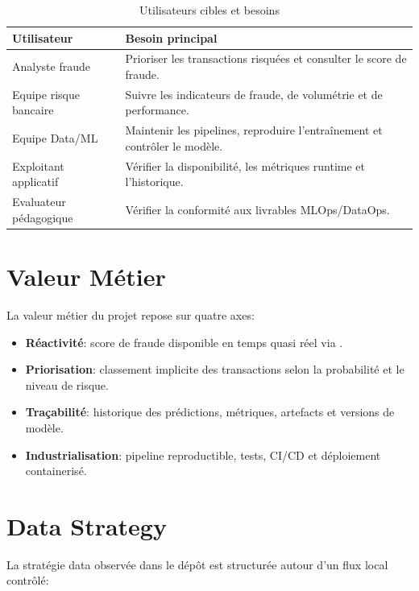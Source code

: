 \begin{table}[htbp]
\centering
\caption{Utilisateurs cibles et besoins}
\begin{tabularx}{\textwidth}{p{}X}
\toprule
Utilisateur & Besoin principal\\
\midrule
Analyste fraude & Prioriser les transactions risquées et consulter le score de fraude.\\
Equipe risque bancaire & Suivre les indicateurs de fraude, de volumétrie et de performance.\\
Equipe Data/ML & Maintenir les pipelines, reproduire l'entraînement et contrôler le modèle.\\
Exploitant applicatif & Vérifier la disponibilité, les métriques runtime et l'historique.\\
Evaluateur pédagogique & Vérifier la conformité aux livrables MLOps/DataOps.\\
\bottomrule
\end{tabularx}
\end{table}

\section{Valeur Métier}

La valeur métier du projet repose sur quatre axes:

\begin{itemize}
    \item \textbf{Réactivité}: score de fraude disponible en temps quasi réel via .
    \item \textbf{Priorisation}: classement implicite des transactions selon la probabilité et le niveau de risque.
    \item \textbf{Traçabilité}: historique des prédictions, métriques, artefacts et versions de modèle.
    \item \textbf{Industrialisation}: pipeline reproductible, tests, CI/CD et déploiement containerisé.
\end{itemize}

\section{Data Strategy}

La stratégie data observée dans le dépôt est structurée autour d'un flux local contrôlé:

